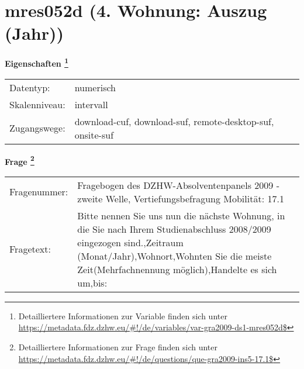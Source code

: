 
    \setcounter{footnote}{0}

    \vspace*{-1.8cm}
	\section{mres052d (4. Wohnung: Auszug (Jahr))}
	\label{section:mres052d}



    \vspace*{0.5cm}
    \noindent\textbf{Eigenschaften
	\footnote{Detailliertere Informationen zur Variable finden sich unter
		\url{https://metadata.fdz.dzhw.eu/\#!/de/variables/var-gra2009-ds1-mres052d$}}}\\
	\begin{tabularx}{\hsize}{@{}lX}
	Datentyp: & numerisch \\
	Skalenniveau: & intervall \\
	Zugangswege: &
	  download-cuf, 
	  download-suf, 
	  remote-desktop-suf, 
	  onsite-suf
 \\
    \end{tabularx}



				\vspace*{0.5cm}
                \noindent\textbf{Frage
	                \footnote{Detailliertere Informationen zur Frage finden sich unter
		              \url{https://metadata.fdz.dzhw.eu/\#!/de/questions/que-gra2009-ins5-17.1$}}}\\
				\begin{tabularx}{\hsize}{@{}lX}
					Fragenummer: &
					  Fragebogen des DZHW-Absolventenpanels 2009 - zweite Welle, Vertiefungsbefragung Mobilität:
					  17.1
 \\
					Fragetext: & Bitte nennen Sie uns nun die nächste Wohnung, in die Sie nach Ihrem Studienabschluss 2008/2009 eingezogen sind.,Zeitraum (Monat/Jahr),Wohnort,Wohnten Sie die meiste Zeit(Mehrfachnennung möglich),Handelte es sich um,bis: \\
				\end{tabularx}





